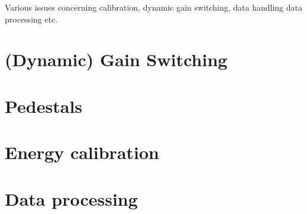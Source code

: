 
Various issues concerning calibration, dynamic gain switching, data handling data processing etc.
\section{(Dynamic) Gain Switching}
\section{Pedestals}
\section{Energy calibration}
\section{Data processing}


